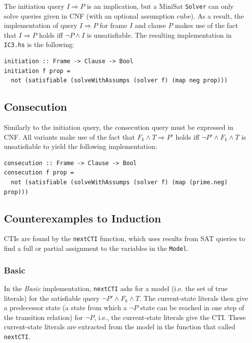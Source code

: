 \documentclass[12pt,a4paper,twoside,openright]{report}
\begin{document}
{The initiation query $I \Rightarrow P$ is an implication, but a MiniSat \verb,Solver, can only
solve queries given in CNF (with an optional assumption cube).
As a result, the implementation of query $I \Rightarrow P$ for frame $I$ and
clause $P$ makes use of the fact that
$I \Rightarrow P$ holds iff $\neg P \wedge I$ is unsatisfiable.
The resulting implementation in \verb,IC3.hs, is the following:

\begin{lstlisting}
initiation :: Frame -> Clause -> Bool
initiation f prop =
  not (satisfiable (solveWithAssumps (solver f) (map neg prop)))
\end{lstlisting}

\subsection{Consecution}

Similarly to the initiation query, the consecution query must be expressed in CNF.
All variants make use of the fact that
$F_k \wedge T \Rightarrow P'$ holds iff $\neg P' \wedge F_k \wedge T$ is unsatisfiable
to yield the following implementation:
\begin{lstlisting}
consecution :: Frame -> Clause -> Bool
consecution f prop =
  not (satisfiable (solveWithAssumps (solver f) (map (prime.neg) prop)))
\end{lstlisting}

\subsection{Counterexamples to Induction}

CTIs are found by the \verb,nextCTI, function, which
uses results from SAT queries to find a full or partial assignment to
the variables in the \verb,Model,.

\subsubsection{Basic}
In the \emph{Basic} implementation, \verb,nextCTI, asks for a model
(i.e. the set of true literals) for the satisfiable query $\neg P' \wedge F_k \wedge T$.
The current-state literals then give a predecessor state (a state from which
a $\neg P$ state can be reached in one step of the transition relation) for $\neg P$,
i.e., the current-state literals give the CTI.
These current-state literals are extracted from the model in the function that
called \verb,nextCTI,.

}
\end{document}

